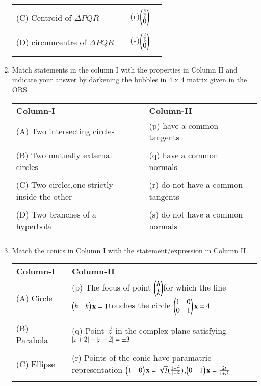 \begin{enumerate}[label=\arabic*.,ref=\thesubsection.\theenumi]
\begin{tabular}{llll}
    &&&\\
    (C) Centroid of $\Delta PQR$&\enspace &   (r)$\begin{pmatrix}{\frac{5}{2}}\\0\end{pmatrix}$\\
    &&&\\
    (D) circumcentre of $\Delta PQR$&\enspace &   (s)$\begin{pmatrix}\frac{2}{3}\\0\end{pmatrix}$\\
    &&&\\
    \end{tabular}  
 \item Match statements in the column I with the properties in Column II and indicate your answer by darkening the bubbles in 4 x 4 matrix given in the ORS.
    \begin{tabular}{llll}
    \textbf{Column-I} &\enspace &\textbf{Column-II}\\
    (A) Two intersecting circles &\enspace &(p) have a common tangents\\
    &&&\\
    (B) Two mutually external circles &\enspace & (q) have a common normals\\
    &&&\\
    (C) Two circles,one strictly inside the other&\enspace &(r) do not have a common tangents\\ &&&\\
    (D) Two branches of a hyperbola& \enspace &(s) do not have a common normals\\&&&\\
    \end{tabular}
    \item Match the conics in Column I with the statement/expression in Column II\\
    \begin{tabular}{llll}
    \textbf{Column-I} & \enspace &\textbf{Column-II}\\
    (A) Circle &\enspace &(p) The focus of point $\begin{pmatrix}h\\k\end{pmatrix}$for which the line $\begin{pmatrix}h&k\end{pmatrix}\mathbf{x}=1$touches the circle $\begin{pmatrix}1&0\\0&1\end{pmatrix}\mathbf{x}=4$\\ &&&\\
    (B) Parabola &\enspace & (q) Point $\vec{z}$ in the complex plane satisfying $\left\vert z+2\right\vert-\left\vert z-2\right\vert=\pm3$\\&&&\\
    (C) Ellipse &\enspace &(r) Points of the conic have paramatric representation $\begin{pmatrix}1&0\end{pmatrix}\mathbf{x}=\sqrt{3}(\frac{1-t^2}{1+t^2})$,$\begin{pmatrix}0&1\end{pmatrix}\mathbf{x}=\frac{2t}{1+t^2}$ \\ &&&\\

\end{tabular}
\end{enumerate}
